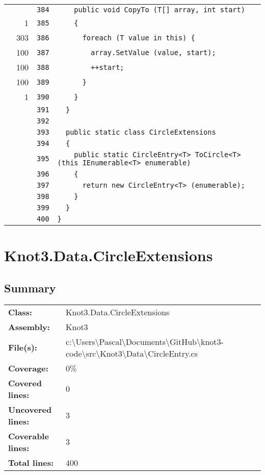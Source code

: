 \documentclass[a4paper,10pt]{article}
\begin{document}
\begin{longtable}[l]{lrrl}
\cellcolor{gray} &  & \verb~384~ & \verb~    public void CopyTo (T[] array, int start)~\\
\cellcolor{green} & 1 & \verb~385~ & \verb~    {~\\
\cellcolor{green} & 303 & \verb~386~ & \verb~      foreach (T value in this) {~\\
\cellcolor{green} & 100 & \verb~387~ & \verb~        array.SetValue (value, start);~\\
\cellcolor{green} & 100 & \verb~388~ & \verb~        ++start;~\\
\cellcolor{green} & 100 & \verb~389~ & \verb~      }~\\
\cellcolor{green} & 1 & \verb~390~ & \verb~    }~\\
\cellcolor{gray} &  & \verb~391~ & \verb~  }~\\
\cellcolor{gray} &  & \verb~392~ & \verb~~\\
\cellcolor{gray} &  & \verb~393~ & \verb~  public static class CircleExtensions~\\
\cellcolor{gray} &  & \verb~394~ & \verb~  {~\\
\cellcolor{gray} &  & \verb~395~ & \verb~    public static CircleEntry<T> ToCircle<T> (this IEnumerable<T> enumerable)~\\
\cellcolor{gray} &  & \verb~396~ & \verb~    {~\\
\cellcolor{gray} &  & \verb~397~ & \verb~      return new CircleEntry<T> (enumerable);~\\
\cellcolor{gray} &  & \verb~398~ & \verb~    }~\\
\cellcolor{gray} &  & \verb~399~ & \verb~  }~\\
\cellcolor{gray} &  & \verb~400~ & \verb~}~\\
\end{longtable}
\newpage
\section{Knot3.Data.CircleExtensions}
\subsection{Summary}
\begin{longtable}[l]{ll}
\textbf{Class:} & Knot3.Data.CircleExtensions\\
\textbf{Assembly:} & Knot3\\
\textbf{File(s):} & \begin{minipage}[t]{12cm}{c:\textbackslash Users\textbackslash Pascal\textbackslash Documents\textbackslash GitHub\textbackslash knot3-code\textbackslash src\textbackslash Knot3\textbackslash Data\textbackslash CircleEntry.cs}\end{minipage} \\
\textbf{Coverage:} & 0\%\\
\textbf{Covered lines:} & 0\\
\textbf{Uncovered lines:} & 3\\
\textbf{Coverable lines:} & 3\\
\textbf{Total lines:} & 400\\
\end{longtable}
\end{document}
